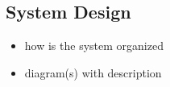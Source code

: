 \subsection{System Design}


\begin{itemize}
    \item how is the system organized
    \item diagram(s) with description
\end{itemize}


